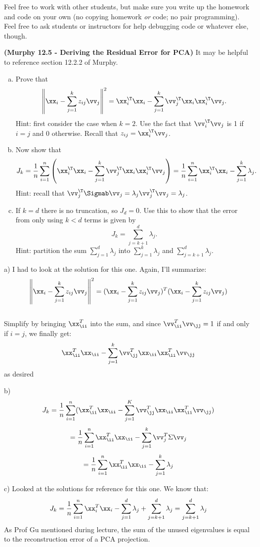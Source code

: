 \documentclass[12pt,letterpaper,fleqn]{hmcpset}
\begin{document}
Feel free to work with other students, but make sure you write up the homework
and code on your own (no copying homework \textit{or} code; no pair programming).
Feel free to ask students or instructors for help debugging code or whatever else,
though.

\begin{problem}[1]
\textbf{(Murphy 12.5 - Deriving the Residual Error for PCA)} It may be helpful to reference
section 12.2.2 of Murphy.
\begin{enumerate}[(a)]
    \item Prove that
        \[
            \left\|\xx_i - \sum_{j=1}^k z_{ij}\vv_j\right\|^2 = \xx_i^\T\xx_i - \sum_{j=1}^k\vv_j^\T \xx_i\xx_i^\T \vv_j.
        \]
        Hint: first consider the case when $k=2$. Use the fact that $\vv_i^\T\vv_j$ is 1 if $i=j$ and 0 otherwise.
        Recall that $z_{ij} = \xx_i^\T\vv_j$.

    \item Now show that
        \[
            J_k = \frac{1}{n}\sum_{i=1}^n \left(\xx_i^\T \xx_i - \sum_{j=1}^k\vv_j^\T \xx_i\xx_i^\T \vv_j\right) = \frac{1}{n}\sum_{i=1}^n \xx_i^\T\xx_i - \sum_{j=1}^k\lambda_j.
        \]
        Hint: recall that $\vv_j^\T \Sigmab \vv_j = \lambda_j\vv_j^\T\vv_j = \lambda_j$.

    \item If $k=d$ there is no truncation, so $J_d=0$. Use this to show that the error from only using $k<d$
        terms is given by
        \[
            J_k = \sum_{j=k+1}^d \lambda_j.
        \]
        Hint: partition the sum $\sum_{j=1}^d \lambda_j$ into $\sum_{j=1}^k \lambda_j$ and $\sum_{j=k+1}^d \lambda_j$.
\end{enumerate}
\end{problem}
\begin{solution}
a) I had to look at the solution for this one. Again, I'll summarize: \\
\[
            \left\|\xx_i - \sum_{j=1}^k z_{ij}\vv_j\right\|^2 = (\xx_i - \sum_{j=1}^k z_{ij}\vv_j)^T(\xx_i - \sum_{j=1}^k z_{ij}\vv_j)
        \] \\
 Simplify by bringing $\xx_{\ii}^T$ into the sum, and since $\vv_{\ii}^T \vv_{\jj} = 1$ if and only if $i = j$, we finally get:
 \[
 \xx_{\ii}^T \xx_{\ii} - \sum_{j=1}^k \vv_{\jj}^T \xx_{\ii} \xx_{\ii}^T \vv_{\jj}
 \] as desired
 
 b) \[ J_k = \frac{1}{n} \sum_{i=1}^n (\xx_{\ii}^T \xx_{\ii} - \sum_{j=1}^K \vv_{\jj}^T \xx_{\ii} \xx_{\ii}^T \vv_{\jj} ) \]
 \[ = \frac{1}{n} \sum_{i=1}^n \xx_{\ii}^T \xx_{\ii} - \sum_{j=1}^k \vv_j^T \Sigma \vv_j \]
 \[ = \frac{1}{n} \sum_{i=1}^n \xx_{\ii}^T \xx_{\ii} - \sum_{j=1}^k \lambda_j \]
 
 c) Looked at the solutions for reference for this one.
 We know that: 
 \[ J_k = \frac{1}{n} \sum_{i=1}^n \xx_i^T \xx_i - \sum_{j=1}^d \lambda_j + \sum_{j=k+1}^d \lambda_j = \sum_{j=k+1}^d \lambda_j \]
 As Prof Gu mentioned during lecture, the sum of the unused eigenvalues is equal to the reconstruction error of a PCA projection.

 
\end{solution}
\newpage
\end{document}
